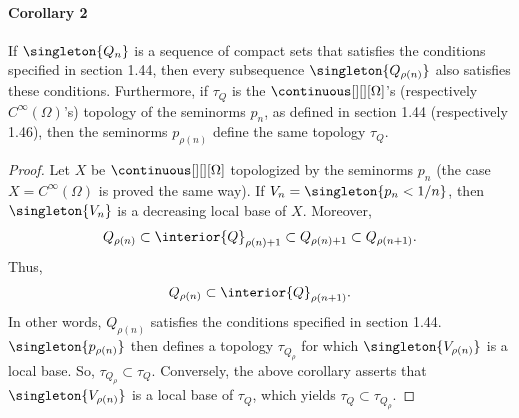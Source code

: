 \paragraph{Corollary 2} %
If 
%
  $\singleton{Q_n}$ 
%
is a sequence of compact sets that satisfies the conditions specified 
in section 1.44, then every subsequence 
%
  $\singleton{Q_{\rho(n)}}$ 
%
also satisfies these conditions.
%
Furthermore, if $\tau_{Q}$ is the $\continuous[][][\Omega]$'s
(respectively $C^\infty (\Omega)$'s) topology of the seminorms %
$p_{n}$, 
as defined in section 1.44 (respectively 1.46), then the seminorms 
%
  $p_{\rho(n)}$ 
%
define the same topology $\tau_{Q}$. %
%
\begin{proof}%
%
Let $X$ be $\continuous[][][\Omega]$ topologized by the seminorms $p_{n}$
(the case $X=C^\infty(\Omega)$ is proved the same way).
%
If 
    $V_{n} = \singleton{p_{n} < 1/n}$, 
then 
    $\singleton{V_{n}}$ 
is a decreasing local base of $X$.
%
Moreover,
% 
  \begin{equation}
    Q_{\rho(n)} 
      \subset 
    \interior{Q}_{\rho(n) + 1} 
      \subset 
    Q_{\rho(n) + 1} 
      \subset 
    Q_{\rho(n+ 1)}.
  \end{equation}
% 
Thus,
%
  \begin{equation}
    Q_{\rho(n)} 
      \subset 
    \interior{Q}_{\rho(n+ 1)}.
  \end{equation}
%
In other words, 
%
  $Q_{\rho(n)}$ satisfies the conditions specified in section 1.44.
%
%
  $\singleton{p_{\rho(n)}}$
% 
then defines a topology $\tau_{Q_\rho}$ for which  
% 
  $\singleton{V_{\rho(n)}}$ 
%
is a local base. So, 
% 
  $\tau_{Q_\rho} \subset \tau_{Q}$.
%
Conversely, the above corollary asserts that 
%
  $\singleton{V_{\rho(n)}}$ 
%
is a local base of $\tau_{Q}$, which yields  
%
  $\tau_{Q}\subset \tau_{Q_\rho}$.
%
\end{proof}
